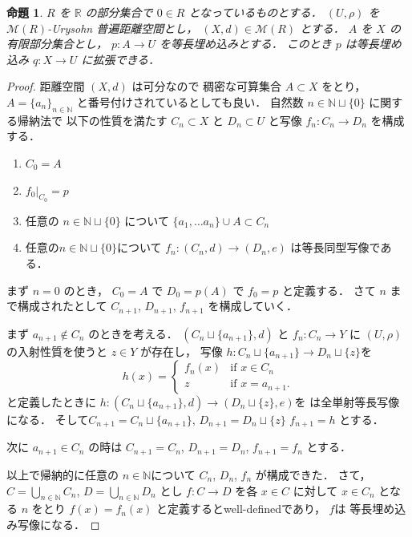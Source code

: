 \documentclass[leqno, 12pt]{jsarticle}
\newtheorem{prop}[thm]{命題}
\newcommand{\nn}{\mathbb{N}}
\newcommand{\rr}{\mathbb{R}}
\begin{document}
\begin{prop}\label{prop:pp:universal}
$R$
を
$\rr$
の部分集合で
$0\in R$
となっているものとする．
$(U, \rho)$
を
$\mathscr{M}(R)$-Urysohn
普遍距離空間とし，
$(X, d)\in \mathscr{M}(R)$
とする．
$A$
を
$X$
の有限部分集合とし，
$p\colon  A\to U$
を等長埋め込みとする．
このとき
$p$
は等長埋め込み
$q\colon  X\to U$
に拡張できる．
\end{prop}
\begin{proof}
距離空間
$(X, d)$
は可分なので
稠密な可算集合
$A\subset X$
をとり，
$A=\{a_{n}\}_{n\in \nn}$
と番号付けされているとしても良い．
自然数
$n\in \nn\sqcup\{0\}$
に関する帰納法で
以下の性質を満たす
$C_{n}\subset X$
と
$D_{n}\subset U$
と写像
$f_{n}\colon  C_{n}\to D_{n}$
を構成する．
\begin{enumerate}
\item 
$C_{0}=A$
\item 
$f_{0}|_{C_{0}}=p$
\item 
任意の
$n\in \nn\sqcup\{0\}$
について
$\{a_{1}, \dots a_{n}\}\cup A\subset C_{n}$
\item 
任意の$n\in \nn\sqcup\{0\}$について
$f_{n}\colon  (C_{n}, d)\to (D_{n}, e)$
は等長同型写像である．
\end{enumerate}
まず
$n=0$
のとき，
$C_{0}=A$
で
$D_{0}=p(A)$
で
$f_{0}=p$
と定義する．
さて
$n$
まで構成されたとして
 $C_{n+1}$, 
 $D_{n+1}$, 
 $f_{n+1}$
 を構成していく．
 
まず
$a_{n+1}\not\in C_{n}$
のときを考える．
$(C_{n}\sqcup\{a_{n+1}\}, d)$
と
$f_{n}\colon  C_{n}\to Y$
に
$(U, \rho)$
の入射性質を使うと
$z\in Y$
が存在し，
写像
$h\colon  C_{n}\sqcup \{a_{n+1}\}\to D_{n}\sqcup \{z\}$を
\[
h(x)=
\begin{cases}
	f_{n}(x) & \text{if $x\in C_{n}$}\\
	z & \text{if $x=a_{n+1}$}. 
\end{cases}
\]
と定義したときに
$h\colon (C_{n}\sqcup \{a_{n+1}\}, d)\to (D_{n}\sqcup \{z\}, e)$を
は全単射等長写像になる．
そして$C_{n+1}=C_{n}\sqcup \{a_{n+1}\}$, 
$D_{n+1}=D_n\sqcup\{z\}$
$f_{n+1}=h$
とする．

次に
$a_{n+1}\in C_n$
の時は
$C_{n+1}=C_{n}$, 
$D_{n+1}=D_{n}$, 
$f_{n+1}=f_{n}$
とする．

以上で帰納的に任意の
$n\in \nn$について
$C_{n}$, 
$D_{n}$, 
$f_{n}$
が構成できた．
さて，
$C=\bigcup_{n\in \nn}C_{n}$, 
$D=\bigcup_{n\in \nn}D_{n}$
とし
$f\colon  C\to  D$
を各
$x\in C$
に対して
$x\in C_{n}$
となる
$n$
をとり
$f(x)=f_{n}(x)$
と定義するとwell-definedであり，
$f$は
等長埋め込み写像になる．





\end{proof}
\end{document}
